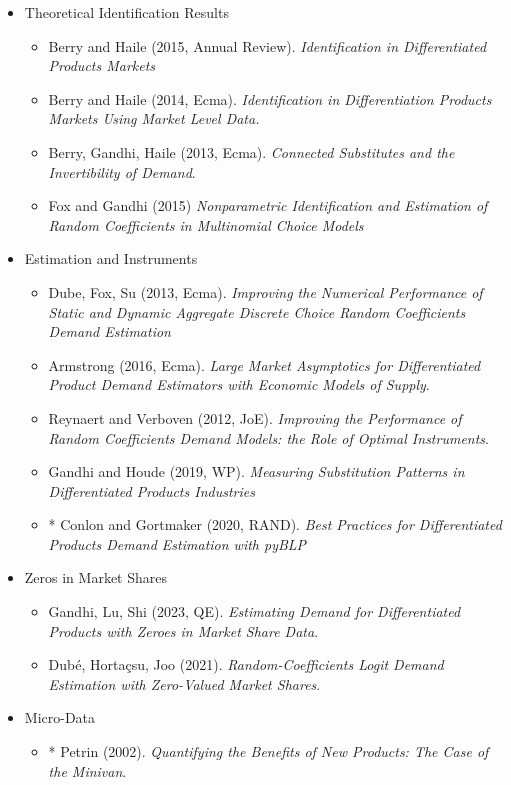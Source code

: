 \documentclass[11pt]{article}
\begin{document}
\begin{itemize}
\item Theoretical Identification Results
\begin{itemize}
\item Berry and Haile (2015, Annual Review). \textit{Identification in Differentiated Products Markets}
\item Berry and Haile (2014, Ecma). \textit{Identification in Differentiation Products Markets Using Market Level Data.}
\item Berry, Gandhi, Haile (2013, Ecma). \textit{Connected Substitutes and the Invertibility of Demand}.
\item Fox and Gandhi (2015) \textit{Nonparametric Identification and Estimation of Random Coefficients in Multinomial Choice Models}
\end{itemize}
\item Estimation and Instruments
\begin{itemize}
\item Dube, Fox, Su (2013, Ecma). \textit{Improving the Numerical Performance of Static and Dynamic Aggregate Discrete Choice Random Coefficients Demand Estimation}
\item Armstrong (2016, Ecma). \textit{Large Market Asymptotics for Differentiated Product Demand Estimators with Economic Models of Supply}.
\item Reynaert and Verboven (2012, JoE). \textit{Improving the Performance of Random Coefficients Demand Models: the Role of Optimal Instruments}.
\item Gandhi and Houde (2019, WP). \textit{Measuring Substitution Patterns in Differentiated Products Industries}
\item * Conlon and Gortmaker (2020, RAND). \textit{Best Practices for Differentiated Products Demand Estimation with pyBLP}
\end{itemize}
\item Zeros in Market Shares
\begin{itemize}
\item Gandhi, Lu, Shi (2023, QE). \textit{Estimating Demand for Differentiated Products with Zeroes in Market Share Data}.
\item Dub\'e, Horta\c{c}su, Joo (2021). \textit{Random-Coefficients Logit Demand Estimation with Zero-Valued Market Shares}.
\end{itemize}
\item Micro-Data
\begin{itemize}
\item * Petrin (2002). \textit{Quantifying the Benefits of New Products: The Case of the Minivan}.

\end{itemize}
\end{itemize}
\end{document}
